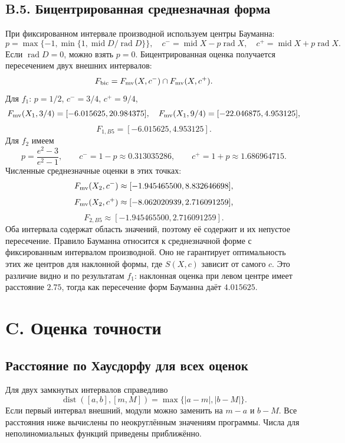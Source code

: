 \documentclass[12pt,a4paper]{article}
\newcommand{\rad}{\operatorname{rad}}
\newcommand{\midpoint}{\operatorname{mid}}
\newcommand{\dist}{\operatorname{dist}}
\begin{document}
\subsection*{B.5. Бицентрированная среднезначная форма}
При фиксированном интервале производной используем центры Бауманна:
\begin{equation}\label{eq:baumann}
p=\max\{-1,\min\{1,\midpoint D/\rad D\}\},\quad
c^-=\midpoint X-p\rad X,\quad c^+=\midpoint X+p\rad X.
\end{equation}
Если $\rad D=0$, можно взять $p=0$. Бицентрированная оценка получается
пересечением двух внешних интервалов:
\[
F_{\rm bic}=F_{\rm mv}(X,c^-)\cap F_{\rm mv}(X,c^+).
\]
Для $f_1$: $p=1/2$, $c^-=3/4$, $c^+=9/4$,
\[
F_{\rm mv}(X_1,3/4)=[-6.015625,20.984375],\quad
F_{\rm mv}(X_1,9/4)=[-22.046875,4.953125],
\]
\[
F_{1,B5}=[-6.015625,4.953125].
\]
Для $f_2$ имеем
\[
p=\frac{e^2-3}{e^2-1},\qquad c^-=1-p\approx0.313035286,
\qquad c^+=1+p\approx1.686964715.
\]
Численные среднезначные оценки в этих точках:
\[
F_{\rm mv}(X_2,c^-)\approx[-1.945465500,8.832646698],
\]
\[
F_{\rm mv}(X_2,c^+)\approx[-8.062020939,2.716091259],
\]
\[
F_{2,B5}\approx[-1.945465500,2.716091259].
\]
Оба интервала содержат область значений, поэтому её содержит
и их непустое пересечение.
Правило Бауманна относится к среднезначной форме с фиксированным
интервалом производной. Оно не гарантирует оптимальность этих же
центров для наклонной формы, где $S(X,c)$ зависит от самого $c$.
Это различие видно и по результатам $f_1$: наклонная оценка
при левом центре имеет расстояние $2.75$, тогда как пересечение
форм Бауманна даёт $4.015625$.

\section*{C. Оценка точности}
\subsection*{Расстояние по Хаусдорфу для всех оценок}
Для двух замкнутых интервалов справедливо
\begin{equation}\label{eq:hausdorff}
\dist([a,b],[m,M])=\max\{|a-m|,|b-M|\}.
\end{equation}
Если первый интервал внешний, модули можно заменить на $m-a$ и $b-M$.
Все расстояния ниже вычислены по неокруглённым значениям программы.
Числа для неполиномиальных функций приведены приближённо.
\end{document}
